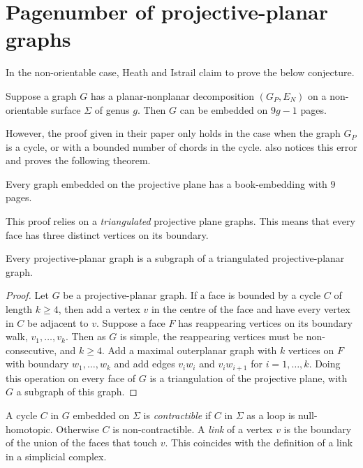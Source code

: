 
\section{Pagenumber of projective-planar graphs}
In the non-orientable case, Heath and Istrail claim to prove the below conjecture.
\begin{conjecture}\label{lem:planar_nonplanar_nonorientable}
	Suppose a graph \(G\) has a planar-nonplanar decomposition \((G_P, E_N)\) on a non-orientable surface \(\Sigma\) of genus $g$. Then \(G\) can be embedded on \(9g - 1\) pages.
\end{conjecture}
However, the proof given in their paper only holds in the case when the graph $G_P$ is a cycle, or with a bounded number of chords in the cycle. \textcite{nakamotoBookEmbeddingProjectiveplanar2015} also notices this error and proves the following theorem.

\begin{theorem}\label{thm:proj_planar_graphs_9pages}
	Every graph embedded on the projective plane has a book-embedding with $9$ pages.
\end{theorem}

This proof relies on a \textit{triangulated} projective plane graphs. This means that every face has three distinct vertices on its boundary. 

\begin{theorem}
    Every projective-planar graph is a subgraph of a triangulated projective-planar graph.
\end{theorem}

\begin{proof}
    Let $G$ be a projective-planar graph. If a face is bounded by a cycle $C$ of length $k \geq 4$, then add a vertex $v$ in the centre of the face and have every vertex in $C$ be adjacent to $v$. Suppose a face $F$ has reappearing vertices on its boundary walk, $v_1, \ldots, v_k$. Then as $G$ is simple, the reappearing vertices must be non-consecutive, and $k \geq 4$. Add a maximal outerplanar graph with $k$ vertices on $F$ with boundary $w_1, \ldots, w_k$ and add edges $v_i w_i$ and $v_i w_{i + 1}$ for $i = 1, \ldots, k$. Doing this operation on every face of $G$ is a triangulation of the projective plane, with $G$ a subgraph of this graph.  
\end{proof}

A cycle $C$ in $G$ embedded on $\Sigma$ is \textit{contractible} if $C$ in $\Sigma$ as a loop is null-homotopic. Otherwise $C$ is non-contractible. 
A \textit{link} of a vertex $v$ is the boundary of the union of the faces that touch $v$. This coincides with the definition of a link in a simplicial complex.

